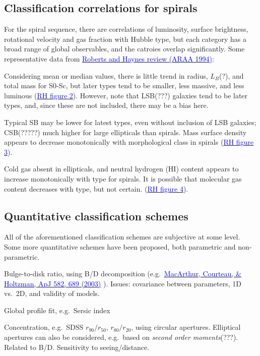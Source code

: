 \documentclass[12pt]{article}
\begin{document}
\subsection*{Classification correlations for spirals}
For the spiral sequence, there are correlations of
luminosity, surface brightness, rotational velocity and gas fraction
with Hubble type, but each category has a broad range of global observables,
and the catroies overlap significantly. Some representative data from
\href{http://adsabs.harvard.edu/cgi-bin/nph-bib_query?bibcode=1994ARA\%26A..32..115}
{\textcolor{blue}{Roberts and Haynes review (ARAA 1994)}}:
\begin{itemize*}
    \item Considering mean or median values, there is little trend in
        radius, $L_B$(?), and total mass for S0-Sc, but later types tend
        to be smaller, less massive, and less luminous
        (\href{http://astronomy.nmsu.edu/holtz/a555/html/diagrams/a616/rh2.htm}
        {\textcolor{blue}{RH figure 2}}).
        However, note that LSB(???) galaxies tend to be later types, and,
        since these are not included, there may be a bias here.
    \item Typical SB may be lower for latest types, even without inclusion
        of LSB galaxies; CSB(?????) much higher for large ellipticals than
        spirals. Mass surface density appears to decrease monotonically with
        morphological class in spirals
        (\href{http://astronomy.nmsu.edu/holtz/a555/html/diagrams/a616/rh3.htm}
        {\textcolor{blue}{RH figure 3}}).
    \item Cold gas absent in ellipticals, and neutral hydrogen (HI) content
        appears to increase monotonically with type for spirals. It is possible
        that molecular gas content decreases with type, but not certain.
        (\href{http://astronomy.nmsu.edu/holtz/a555/html/diagrams/a616/rh4.htm}
        {\textcolor{blue}{RH figure 4}}).
\end{itemize*}

\subsection*{Quantitative classification schemes}
All of the aforementioned classification schemes are subjective at some level.
Some more quantitative schemes have been proposed, both parametric and non-parametric.
\begin{itemize*}
    \item Bulge-to-disk ratio, using B/D decomposition (e.g.\
        \href{http://adsabs.harvard.edu/cgi-bin/nph-bib_query?bibcode=2003ApJ...582..689}
        {\textcolor{blue}{MacArthur, Courteau, \& Holtzman, ApJ 582, 689 (2003)}}
        ).
        Issues: covariance between parameters, 1D vs.\ 2D, and validity of models.
    \item Global profile fit, e.g.\ Sersic index
    \item Concentration, e.g.\ SDSS $r_{90}/r_{50}$, $r_{80}/r_{20}$,
        using circular apertures. Elliptical apertures can also be considered,
        e.g.\ based on \emph{second order moments}(???).
        Related to B/D. Sensitivity to seeing/distance.
\end{itemize*}
\end{document}

